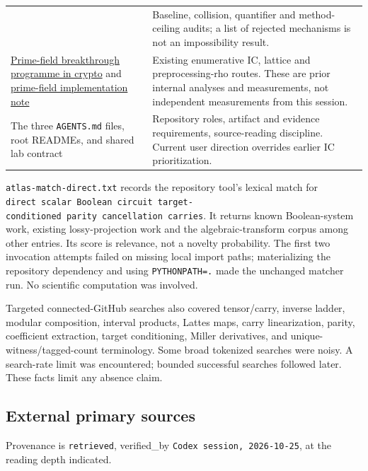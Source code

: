 \documentclass[
  10pt,
]{article}
\begin{document}
\begin{longtable}[]{@{}
  >{\raggedright\arraybackslash}p{}
  >{\raggedright\arraybackslash}p{}@{}}
{protocol} & Baseline, collision, quantifier and method-ceiling audits; a
list of rejected mechanisms is not an impossibility result. \\
\href{https://github.com/aburan28/crypto/blob/5cb553810e5bbfbd8691ec614ffcaacefc625757/RESEARCH_PRIME_FIELD_BREAKTHROUGH_PROGRAM.md}{Prime-field
breakthrough programme in crypto} and
\href{https://github.com/aburan28/crypto/blob/5cb553810e5bbfbd8691ec614ffcaacefc625757/RESEARCH_PRIME_FAST_ECDLP.md}{prime-field
implementation note} & Existing enumerative IC, lattice and
preprocessing-rho routes. These are prior internal analyses and
measurements, not independent measurements from this session. \\
The three \texttt{AGENTS.md} files, root READMEs, and shared lab
contract & Repository roles, artifact and evidence requirements,
source-reading discipline. Current user direction overrides earlier IC
prioritization. \\
\end{longtable}

\texttt{atlas-match-direct.txt} records the repository tool's lexical
match for
\texttt{direct\ scalar\ Boolean\ circuit\ target-conditioned\ parity\ cancellation\ carries}.
It returns known Boolean-system work, existing lossy-projection work and
the algebraic-transform corpus among other entries. Its score is
relevance, not a novelty probability. The first two invocation attempts
failed on missing local import paths; materializing the repository
dependency and using \texttt{PYTHONPATH=.} made the unchanged matcher
run. No scientific computation was involved.

Targeted connected-GitHub searches also covered tensor/carry, inverse
ladder, modular composition, interval products, Lattes maps, carry
linearization, parity, coefficient extraction, target conditioning,
Miller derivatives, and unique-witness/tagged-count terminology. Some
broad tokenized searches were noisy. A search-rate limit was
encountered; bounded successful searches followed later. These facts
limit any absence claim.

\subsection{External primary sources}\label{external-primary-sources}

Provenance is \texttt{retrieved}, verified\_by
\texttt{Codex\ session,\ 2026-10-25}, at the reading depth indicated.
\end{document}
